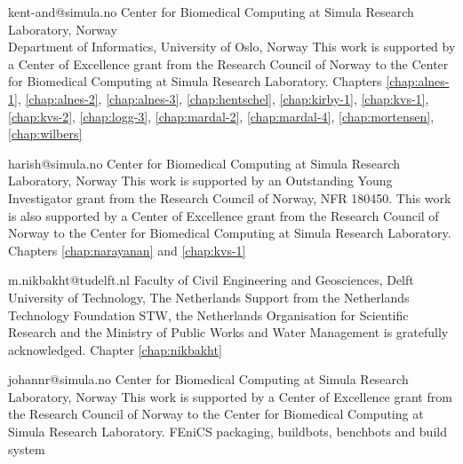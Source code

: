

             {kent-and@simula.no}
             {Center for Biomedical Computing at Simula Research Laboratory, Norway \\
              Department of Informatics, University of Oslo, Norway}
             {This work is supported by a Center of Excellence grant
              from the Research Council of Norway to the Center for
              Biomedical Computing at Simula Research Laboratory.}
             {Chapters
              \ref{chap:alnes-1}, \ref{chap:alnes-2}, \ref{chap:alnes-3},
              \ref{chap:hentschel}, \ref{chap:kirby-1}, \ref{chap:kvs-1},
              \ref{chap:kvs-2}, \ref{chap:logg-3}, \ref{chap:mardal-2},
              \ref{chap:mardal-4}, \ref{chap:mortensen}, \ref{chap:wilbers}}


             {harish@simula.no}
             {Center for Biomedical Computing at Simula Research Laboratory, Norway}
             {This work is supported by an Outstanding Young
              Investigator grant from the Research Council of Norway,
              NFR 180450. This work is also supported by a Center of
              Excellence grant from the Research Council of Norway to
              the Center for Biomedical Computing at Simula Research
              Laboratory.}
             {Chapters \ref{chap:narayanan} and \ref{chap:kvs-1}}


             {m.nikbakht@tudelft.nl}
             {Faculty of Civil Engineering and Geosciences,
             Delft University of Technology, The Netherlands}
             {Support from the Netherlands Technology Foundation STW,
              the Netherlands Organisation for Scientiﬁc Research
              and the Ministry of Public Works and Water Management is
              gratefully acknowledged.}
             {Chapter \ref{chap:nikbakht}}


             {johannr@simula.no}
             {Center for Biomedical Computing at Simula Research Laboratory, Norway}
             {This work is supported by a Center of Excellence grant
              from the Research Council of Norway to the Center for
              Biomedical Computing at Simula Research Laboratory.}
             {FEniCS packaging, buildbots, benchbots and build system}

